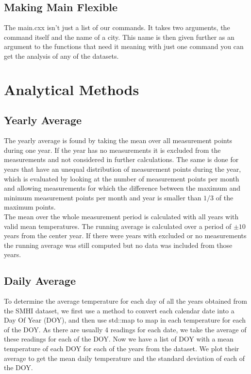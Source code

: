 \documentclass[12pt]{article}
\numberwithin{equation}{section}
\begin{document}
\subsection{Making Main Flexible}
The main.cxx isn't just a list of our commands. It takes two arguments, the command itself and the name of a city. This name is then given further as an argument to the functions that need it meaning with just one command you can get the analysis of any of the datasets. 


\section{Analytical Methods}

\subsection{Yearly Average}
The yearly average is found by taking the mean over all measurement points during one year. If the year has no measurements it is excluded from the measurements and not considered in further calculations. The same is done for years that have an unequal distribution of measurement points during the year, which is evaluated by looking at the number of measurement points per month and allowing measurements for which the difference between the maximum and minimum measurement points per month and year is smaller than $1/3$ of the maximum points.\\
The mean over the whole measurement period is calculated with all years with valid mean temperatures.
The running average is calculated over a period of $\pm 10$ years from the center year. If there were years with excluded or no measurements the running average was still computed but no data was included from those years.

\subsection{Daily Average}

To determine the average temperature for each day of all the years obtained from the SMHI dataset, we first use a method to convert each calendar date into a Day Of Year (DOY), and then use std::map to map in each temperature for each of the DOY.
As there are usually 4 readings for each date, we take the average of these readings for each of the DOY. Now we have a list of DOY with a mean temperature of each DOY for each of the years from the dataset. We plot their average to get the mean daily temperature and the standard deviation of each of the DOY.
\end{document}
